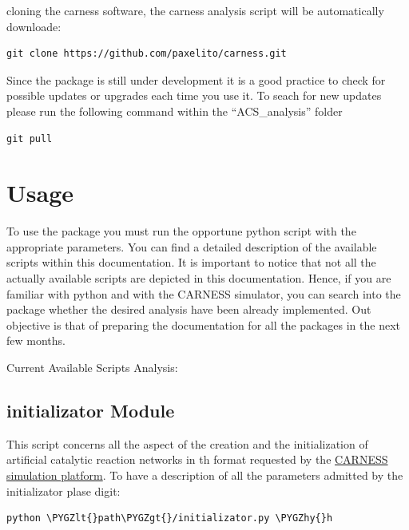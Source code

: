 \documentclass[letterpaper,10pt,english]{sphinxmanual}
\def\PYGZlt{\char`\<}
\def\PYGZgt{\char`\>}
\def\PYGZhy{\char`\-}
\begin{document}
cloning the carness software, the carness analysis script will be automatically downloade:

\begin{Verbatim}[commandchars=\\\{\}]
git clone https://github.com/paxelito/carness.git
\end{Verbatim}

Since the package is still under development it is a good practice to check for possible updates or upgrades each time you use it. To seach for new updates please run the following command within the ``ACS\_analysis'' folder

\begin{Verbatim}[commandchars=\\\{\}]
git pull
\end{Verbatim}


\chapter{Usage}
\label{index:usage}
To use the package you must run the opportune python script with the appropriate parameters. You can find a detailed description of the available scripts within this documentation.
It is important to notice that not all the actually available scripts are depicted in this documentation. Hence, if you are familiar with python and with the CARNESS simulator, you can search into the package whether the desired analysis have been already implemented.
Out objective is that of preparing the documentation for all the packages in the next few months.

Current Available Scripts Analysis:


\section{initializator Module}
\label{initializator:initializator-module}\label{initializator::doc}\label{initializator:module-initializator}
This script concerns all the aspect of the creation and the initialization of artificial catalytic reaction networks in th format 
requested by the \href{http://github.org/carness}{CARNESS simulation platform}.
To have a description of all the parameters admitted by the initializator plase digit:

\begin{Verbatim}[commandchars=\\\{\}]
python \PYGZlt{}path\PYGZgt{}/initializator.py \PYGZhy{}h
\end{Verbatim}
\end{document}
